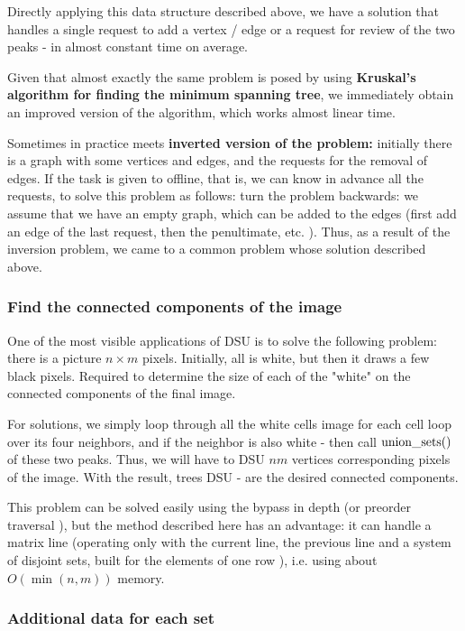 Directly applying this data structure described above, we have a solution that handles a single request to add a vertex / edge or a request for review of the two peaks - in almost constant time on average.

Given that almost exactly the same problem is posed by using \textbf{Kruskal's algorithm for finding the minimum spanning tree}, we immediately obtain an improved version of the algorithm, which works almost linear time.

Sometimes in practice meets \textbf{inverted version of the problem:} initially there is a graph with some vertices and edges, and the requests for the removal of edges. If the task is given to offline, that is, we can know in advance all the requests, to solve this problem as follows: turn the problem backwards: we assume that we have an empty graph, which can be added to the edges (first add an edge of the last request, then the penultimate, etc. ). Thus, as a result of the inversion problem, we came to a common problem whose solution described above.

\subsubsection{ Find the connected components of the image }

One of the most visible applications of DSU is to solve the following problem: there is a picture $n \times m$ pixels. Initially, all is white, but then it draws a few black pixels. Required to determine the size of each of the "white" on the connected components of the final image.

For solutions, we simply loop through all the white cells image for each cell loop over its four neighbors, and if the neighbor is also white - then call ${\rm union \_sets}()$ of these two peaks. Thus, we will have to DSU $nm$ vertices corresponding pixels of the image. With the result, trees DSU - are the desired connected components.

This problem can be solved easily using the bypass in depth (or preorder traversal ), but the method described here has an advantage: it can handle a matrix line (operating only with the current line, the previous line and a system of disjoint sets, built for the elements of one row ), i.e. using about $O (\min (n, m))$ memory.

\subsubsection{ Additional data for each set }


